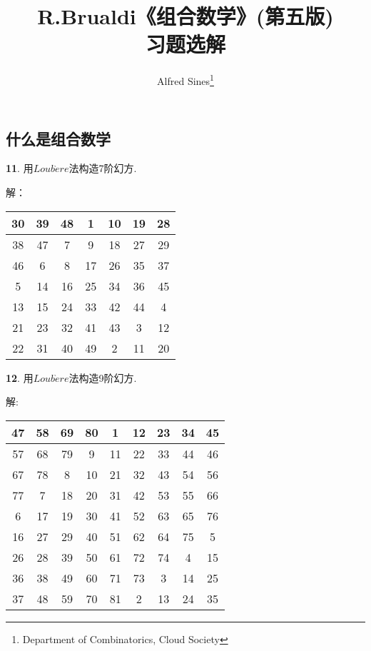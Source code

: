 \documentclass[12pt,a4paper]{article}
\begin{document}
\begin{CJK*}{GBK}{song}

\large
\title{\textbf{R.Brualdi《组合数学》(第五版)\\ 习题选解}}
\author{Alfred Sines\footnote{Department of Combinatorics, Cloud Society}}
\maketitle

\renewcommand{\contentsname}{\centerline{目录}}
\tableofcontents

\newpage
{}

\setlength{\parindent}{0pt}
\setlength{\parskip}{0.5em}
\section{什么是组合数学}

\par \textbf{11}. 用$Loub\grave{e}re$法构造7阶幻方.

\par 解：
\begin{tabular}{|c|c|c|c|c|c|c|}
\hline
30&39&48&1&10&19&28\\
\hline
38&47&7&9&18&27&29\\
\hline
46&6&8&17&26&35&37\\
\hline
5&14&16&25&34&36&45\\
\hline
13&15&24&33&42&44&4\\
\hline
21&23&32&41&43&3&12\\
\hline
22&31&40&49&2&11&20\\
\hline
\end{tabular}

\par \textbf{12}. 用$Loub\grave{e}re$法构造9阶幻方.
\par 解:
\begin{tabular}{|c|c|c|c|c|c|c|c|c|}
\hline
47&58&69&80&1&12&23&34&45\\
\hline
57&68&79&9&11&22&33&44&46\\
\hline
67&78&8&10&21&32&43&54&56\\
\hline
77&7&18&20&31&42&53&55&66\\
\hline
6&17&19&30&41&52&63&65&76\\
\hline
16&27&29&40&51&62&64&75&5\\
\hline
26&28&39&50&61&72&74&4&15\\
\hline
36&38&49&60&71&73&3&14&25\\
\hline
37&48&59&70&81&2&13&24&35\\
\hline
\end{tabular}


\end{CJK*}
\end{document}
